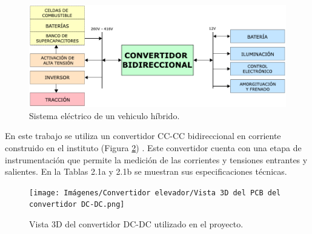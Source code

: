 \begin{figure}[hbt!]
    \centering
    \includegraphics[width=0.75\columnwidth]{Imágenes/Convertidor elevador/Sistema eléctrico de un vehículo híbrido.pdf}
    \caption{Sistema eléctrico de un vehiculo híbrido.}
    \label{sistema-electrico-hev}
\end{figure} 

En este trabajo se utiliza un convertidor CC-CC bidireccional en corriente construido en el instituto (Figura \ref{convertidor-leici}) \cite{caravelli}. Este convertidor cuenta con una etapa de instrumentación que permite la medición de las corrientes y tensiones entrantes y salientes. En la Tablas 2.1a y 2.1b se muestran sus especificaciones técnicas.

\begin{figure}[hbt!]
    \centering
    \texttt{[image: Imágenes/Convertidor elevador/Vista 3D del PCB del convertidor DC-DC.png]}
    \caption{Vista 3D del convertidor DC-DC utilizado en el proyecto.}
    \label{convertidor-leici}
\end{figure} 


